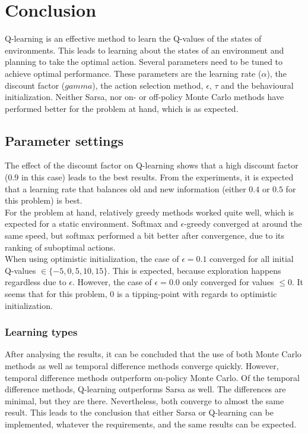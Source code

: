\documentclass{article}
\begin{document}
\pagebreak
\section{Conclusion}
Q-learning is an effective method to learn the Q-values of the states of environments. This leads to learning about the states of an environment and planning to take the optimal action. Several parameters need to be tuned to achieve optimal performance. These parameters are the learning rate  ($\alpha$), the discount factor ($gamma$), the action selection method, $\epsilon$, $\tau$ and the behavioural initialization. Neither Sarsa, nor on- or off-policy Monte Carlo methods have performed better for the problem at hand, which is as expected.
\subsection{Parameter settings}
The effect of the discount factor on Q-learning shows that a high discount factor ($0.9$ in this case) leads to the best results. From the experiments, it is expected that a learning rate that balances old and new information (either $0.4$ or $0.5$ for this problem) is best. \\
For the problem at hand, relatively greedy methods worked quite well, which is expected for a static environment. Softmax and $\epsilon$-greedy converged at around the same speed, but softmax performed a bit better after convergence, due to its ranking of suboptimal actions. \\
When using optimistic initialization, the case of $\epsilon=0.1$ converged for all initial Q-values $\in \{-5,0,5,10,15\}$. This is expected, because exploration happens regardless due to $\epsilon$. However, the case of $\epsilon=0.0$ only converged for values $\le 0$. It seems that for this problem, $0$ is a tipping-point with regards to optimistic initialization.

\subsubsection{Learning types}
After analysing the results, it can be concluded that the use of both Monte Carlo methods as well as temporal difference methods converge quickly. However, temporal difference methods outperform on-policy Monte Carlo. Of the temporal difference methods, Q-learning outperforms Sarsa as well. The differences are minimal, but they are there. Nevertheless, both converge to almost the same result. This leads to the conclusion that either Sarsa or Q-learning can be implemented, whatever the requirements, and the same results can be expected.
\pagebreak
\end{document}
